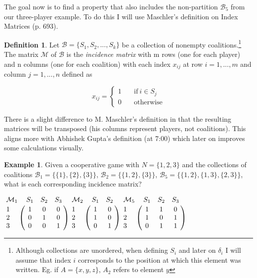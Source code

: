 \documentclass[10pt,a4paper,titlepage]{article}
\theoremstyle{plain}
\theoremstyle{definition}
\newtheorem{definition}[thm]{Definition} %
\newtheorem{example}[thm]{Example} %
\begin{document}
The goal now is to find a property that also includes the non-partition $\mathcal{B}_5$ from our three-player example. To do this I will use Maschler's\cite{maschler} definition on Index Matrices (p. 693).

\begin{definition}
    Let $\mathcal{B} = \{S_1, S_2, ..., S_k\}$ be a collection of nonempty coalitions.\footnote{Although collections are unordered, when defining $S_i$ and later on $\delta_i$ I will assume that index $i$ corresponds to the position at which this element was written. Eg. if $A = \{x, y, z\}$, $A_2$ refers to element $y$} The matrix $\mathcal{M}$ of $\mathcal{B}$ is the \textit{incidence matrix} with m rows (one for each player) and n columns (one for each coalition) with each index $x_{ij}$ at row $i = {1, ..., m}$ and column $j = {1, ..., n}$ defined as\vspace{-15pt}

    \begin{equation*}
        x_{ij} =
        \begin{cases}
            1 & \quad\text{if}\ i \in S_j\\
            0 & \quad\text{otherwise}
        \end{cases}
    \end{equation*}
\end{definition}

There is a slight difference to M. Maschler's\cite{maschler} definition in that the resulting matrices will be transposed (his columns represent players, not coalitions). This aligns more with Abhishek Gupta's\cite{youtube} definition (at 7:00) which later on improves some calculations visually.

\begin{example}\label{ex:indexmatrix}
    Given a cooperative game with $N = \{1, 2, 3\}$ and the collections of coalitions $\mathcal{B}_1 = \{\{1\}, \{2\}, \{3\}\}$, $\mathcal{B}_2 = \{\{1, 2\}, \{3\}\}$, $\mathcal{B}_5 = \{\{1, 2\}, \{1, 3\}, \{2, 3\}\}$, what is each corresponding incidence matrix?\vspace{8pt}

    $
    \bordermatrix{
    \mathcal{M}_1 & S_1 & S_2 & S_3 \cr
    1 & 1 & 0 & 0 \cr
    2 & 0 & 1 & 0 \cr
    3 & 0 & 0 & 1 \cr
    }
    $\hspace{35pt}$
    \bordermatrix{
    \mathcal{M}_2 & S_1 & S_2\cr
    1 & 1 & 0 \cr
    2 & 1 & 0 \cr
    3 & 0 & 1 \cr
    }
    $\hspace{35pt}$
    \bordermatrix{
    \mathcal{M}_5 & S_1 & S_2 & S_3 \cr
    1 & 1 & 1 & 0 \cr
    2 & 1 & 0 & 1 \cr
    3 & 0 & 1 & 1 \cr
    }
    $\vspace{8pt}
\end{example}
\end{document}
